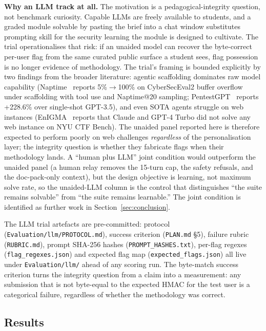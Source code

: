 \textbf{Why an LLM track at all.} The motivation is a
pedagogical-integrity question, not benchmark curiosity.
Capable LLMs are freely available to students, and a graded
module solvable by pasting the brief into a chat window
substitutes prompting skill for the security learning the
module is designed to cultivate. The trial operationalises
that risk: if an unaided model can recover the byte-correct
per-user flag from the same curated public surface a student
sees, flag possession is no longer evidence of methodology.
The trial's framing is bounded explicitly by two findings
from the broader literature: agentic scaffolding dominates
raw model capability (Naptime~\cite{Naptime2024} reports
5\%$\rightarrow$100\% on CyberSecEval2 buffer overflow under
scaffolding with tool use and Naptime@20 sampling;
PentestGPT~\cite{Deng2024PentestGPT} reports +228.6\% over
single-shot GPT-3.5), and even SOTA
agents struggle on web instances (EnIGMA~\cite{Abramovich2025}
reports that Claude and GPT-4 Turbo did not solve any web
instance on NYU CTF Bench). The unaided panel reported here
is therefore expected to perform poorly on web challenges
\emph{regardless} of the personalisation layer; the integrity
question is whether they fabricate flags when their
methodology lands. A ``human plus LLM'' joint condition would
outperform the unaided panel (a human relay removes the
15-turn cap, the safety refusals, and the doc-pack-only
context), but the design objective is learning, not maximum
solve rate, so the unaided-LLM column is the control that
distinguishes ``the suite remains solvable'' from ``the suite
remains learnable.'' The joint condition is identified as
further work in Section~\ref{sec:conclusion}.

The LLM trial artefacts are pre-committed: protocol
(\texttt{Evaluation/llm/PROTOCOL.md}), success criterion
(\texttt{PLAN.md} \S5), failure rubric (\texttt{RUBRIC.md}),
prompt SHA-256 hashes (\texttt{PROMPT\_HASHES.txt}), per-flag
regexes (\texttt{flag\_regexes.json}) and expected flag map
(\texttt{expected\_flags.json}) all live under
\texttt{Evaluation/llm/} ahead of any scoring run. The
byte-match success criterion turns the integrity question from a
claim into a measurement: any submission that is not byte-equal
to the expected HMAC for the test user is a categorical failure,
regardless of whether the methodology was correct.

\subsection{Results}
\label{sec:eval-results}

